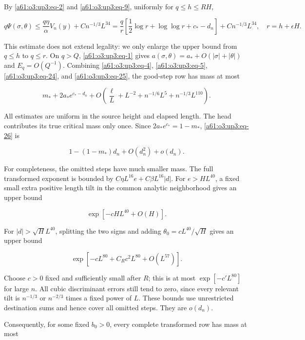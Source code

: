 \documentclass[11pt,letterpaper]{article}
\numberwithin{equation}{section}
\theoremstyle{remark}\newtheorem{remark}[theorem]{Remark}
\begin{document}
By \eqref{a61:o3:up3:eq-2} and \eqref{a61:o3:up3:eq-9}, uniformly for
\(q\le h\le RH\),

\begin{equation}
q\Psi(\sigma,\theta)
 \le\frac{q\eta}{\alpha}V_n(y)+Cn^{-1/3}L^{34}
 =\frac{q}{r}\left[\frac12\log r+\log\log r+c_*-d_n\right]
       +Cn^{-1/3}L^{34},
\quad r=h+\epsilon H.
\label{a61:o3:up3:eq-25}
\end{equation}

This estimate does not extend legality: we only enlarge the upper bound
from \(q\le h\) to \(q\le r\). On \(q>Q\), \eqref{a61:o3:up3:eq-1} gives
\(a(\sigma,\theta)=a_*+O(|\sigma|+|\theta|)\) and \(E_q=O(Q^{-1})\).
Combining \eqref{a61:o3:up3:eq-4}, \eqref{a61:o3:up3:eq-5}, \eqref{a61:o3:up3:eq-24}, and
\eqref{a61:o3:up3:eq-25}, the good-step row has mass at most

\begin{equation}
m_*+2a_*e^{c_*-d_n}
 +O\!\left(\frac{\ell}{L}+L^{-2}
              +n^{-1/6}L^5+n^{-1/3}L^{110}\right).
\label{a61:o3:up3:eq-26}
\end{equation}

All estimates are uniform in the source height and elapsed length. The
head contributes its true critical mass only once. Since
\(2a_*e^{c_*}=1-m_*\), \eqref{a61:o3:up3:eq-26} is

\begin{equation}
1-(1-m_*)d_n+O(d_n^2)+o(d_n).
\label{a61:o3:up3:eq-27}
\end{equation}

For completeness, the omitted steps have much smaller mass. The full
transformed exponent is bounded by \(C\eta L^{16}e+C\beta L^{16}|d|\).
For \(e>HL^{40}\), a fixed small extra positive length tilt in the
common analytic neighborhood gives an upper bound

\[
\exp[-cHL^{40}+O(H)].
\]

For \(|d|>\sqrt H L^{40}\), splitting the two signs and adding
\(\theta_0=cL^{40}/\sqrt H\) gives an upper bound

\[
\exp[-cL^{80}+C_Rc^2L^{80}+O(L^{57})].
\]

Choose \(c>0\) fixed and sufficiently small after \(R\); this is at most
\(\exp[-c'L^{80}]\) for large \(n\). All cubic discriminant errors still
tend to zero, since every relevant tilt is \(n^{-1/3}\) or \(n^{-2/3}\)
times a fixed power of \(L\). These bounds use unrestricted destination
sums and hence cover all omitted steps. They are \(o(d_n)\).

Consequently, for some fixed \(b_0>0\), every complete transformed row
has mass at most
\end{document}
